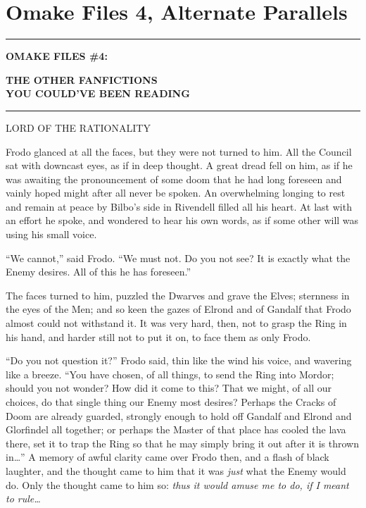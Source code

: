 \chapter{Omake Files 4, Alternate Parallels}

\begin{center}\rule{3in}{0.4pt}\end{center}

\textbf{OMAKE FILES \#4:}

\textbf{THE OTHER FANFICTIONS}\\\textbf{YOU COULD'VE BEEN READING}

\begin{center}\rule{3in}{0.4pt}\end{center}

LORD OF THE RATIONALITY

Frodo glanced at all the faces, but they were not turned to him. All the
Council sat with downcast eyes, as if in deep thought. A great dread
fell on him, as if he was awaiting the pronouncement of some doom that
he had long foreseen and vainly hoped might after all never be spoken.
An overwhelming longing to rest and remain at peace by Bilbo's side in
Rivendell filled all his heart. At last with an effort he spoke, and
wondered to hear his own words, as if some other will was using his
small voice.

``We cannot,'' said Frodo. ``We must not. Do you not see? It is exactly
what the Enemy desires. All of this he has foreseen.''

The faces turned to him, puzzled the Dwarves and grave the Elves;
sternness in the eyes of the Men; and so keen the gazes of Elrond and of
Gandalf that Frodo almost could not withstand it. It was very hard,
then, not to grasp the Ring in his hand, and harder still not to put it
on, to face them as only Frodo.

``Do you not question it?'' Frodo said, thin like the wind his voice,
and wavering like a breeze. ``You have chosen, of all things, to send
the Ring into Mordor; should you not wonder? How did it come to this?
That we might, of all our choices, do that single thing our Enemy most
desires? Perhaps the Cracks of Doom are already guarded, strongly enough
to hold off Gandalf and Elrond and Glorfindel all together; or perhaps
the Master of that place has cooled the lava there, set it to trap the
Ring so that he may simply bring it out after it is thrown in\ldots{}''
A memory of awful clarity came over Frodo then, and a flash of black
laughter, and the thought came to him that it was \emph{just} what the
Enemy would do. Only the thought came to him so: \emph{thus it would
amuse me to do, if I meant to rule\ldots{}}

